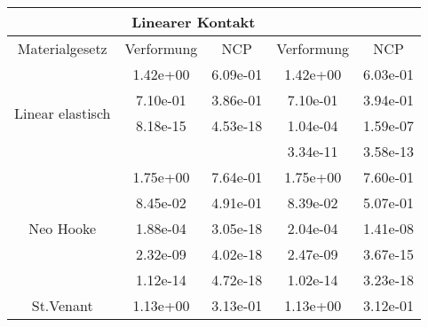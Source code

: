 \begin{table} 
\centering 
\begin{tabular}{c|cc|cc|} 
\cline{2-5} 
 & \multicolumn{2}{|c|}{Linearer Kontakt} &  \\ 
\hline 
\multicolumn{1}{|c|}{Materialgesetz} & \multicolumn{1}{c|}{Verformung} & \multicolumn{1}{c|}{NCP} & \multicolumn{1}{c|}{Verformung} & \multicolumn{1}{c|}{NCP} \\ 
\hline 
\multicolumn{1}{|c|}{\multirow{4}{*}{Linear elastisch}} &\multicolumn{1}{|c|}{  1.42e+00} & \multicolumn{1}{|c|}{  6.09e-01} & \multicolumn{1}{|c|}{  1.42e+00} & \multicolumn{1}{|c|}{  6.03e-01} \\ 
\multicolumn{1}{|c|}{} & \multicolumn{1}{|c|}{  7.10e-01} & \multicolumn{1}{|c|}{  3.86e-01} & \multicolumn{1}{|c|}{  7.10e-01} & \multicolumn{1}{|c|}{  3.94e-01} \\ 
\multicolumn{1}{|c|}{} & \multicolumn{1}{|c|}{  8.18e-15} & \multicolumn{1}{|c|}{  4.53e-18} & \multicolumn{1}{|c|}{  1.04e-04} & \multicolumn{1}{|c|}{  1.59e-07} \\ 
\multicolumn{1}{|c|}{} & \multicolumn{1}{|c|}{} & \multicolumn{1}{|c|}{} & \multicolumn{1}{|c|}{  3.34e-11} & \multicolumn{1}{|c|}{  3.58e-13} \\ 
\hline 
\multicolumn{1}{|c|}{\multirow{5}{*}{Neo Hooke}} &\multicolumn{1}{|c|}{  1.75e+00} & \multicolumn{1}{|c|}{  7.64e-01} & \multicolumn{1}{|c|}{  1.75e+00} & \multicolumn{1}{|c|}{  7.60e-01} \\ 
\multicolumn{1}{|c|}{} & \multicolumn{1}{|c|}{  8.45e-02} & \multicolumn{1}{|c|}{  4.91e-01} & \multicolumn{1}{|c|}{  8.39e-02} & \multicolumn{1}{|c|}{  5.07e-01} \\ 
\multicolumn{1}{|c|}{} & \multicolumn{1}{|c|}{  1.88e-04} & \multicolumn{1}{|c|}{  3.05e-18} & \multicolumn{1}{|c|}{  2.04e-04} & \multicolumn{1}{|c|}{  1.41e-08} \\ 
\multicolumn{1}{|c|}{} & \multicolumn{1}{|c|}{  2.32e-09} & \multicolumn{1}{|c|}{  4.02e-18} & \multicolumn{1}{|c|}{  2.47e-09} & \multicolumn{1}{|c|}{  3.67e-15} \\ 
\multicolumn{1}{|c|}{} & \multicolumn{1}{|c|}{  1.12e-14} & \multicolumn{1}{|c|}{  4.72e-18} & \multicolumn{1}{|c|}{  1.02e-14} & \multicolumn{1}{|c|}{  3.23e-18} \\ 
\hline 
\multicolumn{1}{|c|}{\multirow{7}{*}{St.Venant}} &\multicolumn{1}{|c|}{  1.13e+00} & \multicolumn{1}{|c|}{  3.13e-01} & \multicolumn{1}{|c|}{  1.13e+00} & \multicolumn{1}{|c|}{  3.12e-01} \\ 

\end{tabular}
\end{table}
